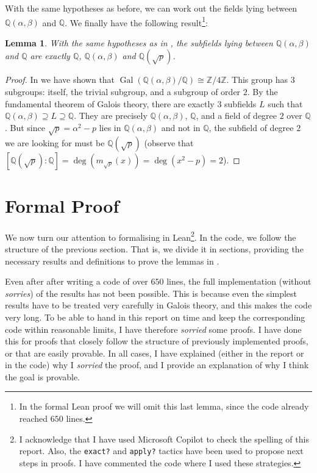 \documentclass[a4paper,11pt]{article}
\theoremstyle{plain}
\newtheorem{lemma}[theorem]{Lemma}
\newcommand{\Q}{\ensuremath{\mathbb{Q}}} %
\newcommand{\Z}{\ensuremath{\mathbb{Z}}} %
\DeclareMathOperator{\Gal}{Gal} %
\begin{document}
	With the same hypotheses as before, we can work out the fields lying between $\Q(\alpha,\beta)$ and $\Q$. We finally have the following result\footnote{In the formal Lean proof we will omit this last lemma, since the code already reached $650$ lines.}:
	\begin{lemma}
		\label{lemma:subfields}
		With the same hypotheses as in , the subfields lying between $\Q(\alpha,\beta)$ and $\Q$ are exactly $\Q$, $\Q(\alpha,\beta)$ and $\Q(\sqrt{p})$.
	\end{lemma}
	\begin{proof}
		In  we have shown that $\Gal(\Q(\alpha,\beta)/\Q)\cong\Z/4\Z$. This group has $3$ subgroups: itself, the trivial subgroup, and a subgroup of order $2$. By the fundamental theorem of Galois theory, there are exactly $3$ subfields $L$ such that $\Q(\alpha,\beta)\supseteq L\supseteq \Q$. They are precisely $\Q(\alpha,\beta)$, $\Q$, and a field of degree $2$ over $\Q$. But since $\sqrt{p}=\alpha^2-p$ lies in $\Q(\alpha,\beta)$ and not in $\Q$, the subfield of degree $2$ we are looking for must be $\Q(\sqrt{p})$ (observe that $\left[\Q(\sqrt{p}):\Q\right]=\deg\left(m_{\sqrt{p}}(x)\right)=\deg(x^2-p)=2$).
	\end{proof} 
	
	\section{Formal Proof}\label{sec:formal}
	 
	 We now turn our attention to formalising  in Lean\footnote{I acknowledge that I have used Microsoft Copilot to check the spelling of this report. Also, the \lstinline|exact?| and \lstinline|apply?| tactics have been used to propose next steps in proofs. I have commented the code where I used these strategies.}. In the code, we follow the structure of the previous section. That is, we divide it in sections, providing the necessary results and definitions to prove the lemmas in .
	 
	 Even after after writing a code of over $650$ lines, the full implementation (without \emph{sorries}) of the results has not been possible. This is because even the simplest results have to be treated very carefully in Galois theory, and this makes the code very long. To be able to hand in this report on time and keep the corresponding code within reasonable limits, I have therefore \emph{sorried} some proofs. I have done this for proofs that closely follow the structure of previously implemented proofs, or that are easily provable. In all cases, I have explained (either in the report or in the code) why I \emph{sorried} the proof, and I provide an explanation of why I think the goal is provable.
	 
\end{document}
